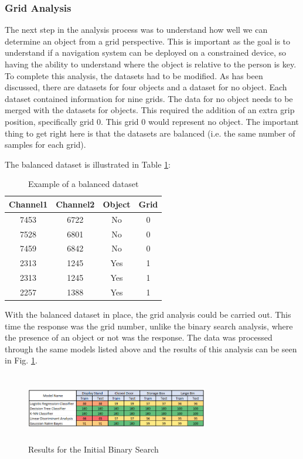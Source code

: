 \documentclass[conference]{IEEEtran}
\begin{document}
\subsubsection{Grid Analysis}
The next step in the analysis process was to understand how well we can determine an object from a grid perspective. This is important as the goal is to understand if a navigation system can be deployed on a constrained device, so having the ability to understand where the object is relative to the person is key. To complete this analysis, the datasets had to be modified. As has been discussed, there are datasets for four objects and a dataset for no object. Each dataset contained information for nine grids. The data for no object needs to be merged with the datasets for objects. This required the addition of an extra grip position, specifically grid 0. This grid 0 would represent no object. The important thing to get right here is that the datasets are balanced (i.e. the same number of samples for each grid). 

The balanced dataset is illustrated in Table \ref{table:3}:

\begin{table}[ht]
\centering
\begin{tabular}{||c c c c||} 
 \hline
 Channel1 & Channel2 & Object & Grid \\ [0.5ex] 
 \hline\hline
 7453 & 6722 & No & 0 \\ 
 \hline
 7528 & 6801 & No & 0 \\
 \hline
 7459 & 6842 & No & 0 \\
 \hline
  2313 & 1245 & Yes & 1 \\
 \hline
  2313 & 1245 & Yes & 1 \\
 \hline
 2257 & 1388 & Yes & 1 \\ [1ex] 
 \hline
\end{tabular}
\caption{Example of a balanced dataset}
\label{table:3}
\end{table}

With the balanced dataset in place, the grid analysis could be carried out. This time the response was the grid number, unlike the binary search analysis, where the presence of an object or not was the response. The data was processed through the same models listed above and the results of this analysis can be seen in Fig. \ref{fig:initial_analysis_gridsearch}.

\begin{figure}[ht]
\includegraphics[width=8cm, height=3cm]{images/initial_analysis_gridsearch.png}
\centering
\caption{Results for the Initial Binary Search}
\label{fig:initial_analysis_gridsearch}
\end{figure}
\end{document}
